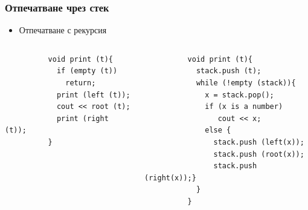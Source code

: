 \documentclass{beamer}
\begin{document}
\begin{frame}[fragile]
\frametitle{Отпечатване чрез стек}

\begin{itemize}
  \item Отпечатване с рекурсия 
\end{itemize}


\begin{columns}[t]
  \begin{column}{0.4\textwidth}
      \begin{flushleft}
        \begin{lstlisting}
          void print (t){
            if (empty (t))
              return;
            print (left (t));
            cout << root (t);
            print (right (t));
          }
        \end{lstlisting}
      \end{flushleft}

  \end{column}
  \begin{column}{0.6\textwidth}
  
      \begin{flushleft}
        \begin{lstlisting}
          void print (t){
            stack.push (t);
            while (!empty (stack)){
              x = stack.pop();
              if (x is a number) 
                 cout << x;
              else {
                stack.push (left(x)); 
                stack.push (root(x));
                stack.push (right(x));}
            }
          }
        \end{lstlisting}
      \end{flushleft}

  \end{column}
\end{columns}




\end{frame}
\end{document}
